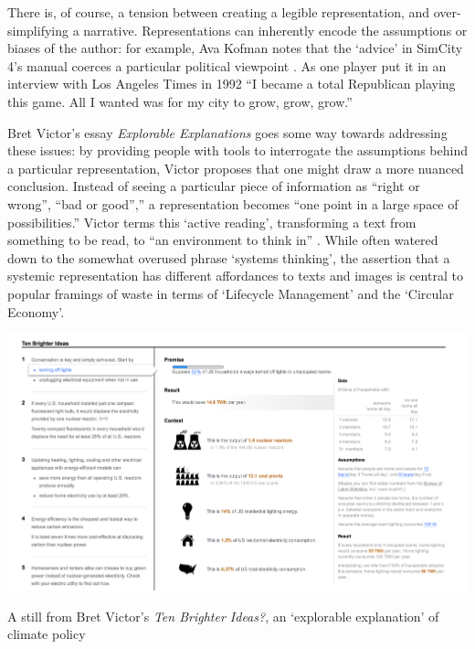 \documentclass[nofonts,nols,justified,nobib]{tufte-book}
\begin{document}

There is, of course, a tension between creating a legible representation, and over-simplifying a narrative. Representations can inherently encode the assumptions or biases of the author: for example, Ava Kofman notes that the `advice' in SimCity 4's manual coerces a particular political viewpoint \cite{kofman_les_2014}. As one player put it in an interview with Los Angeles Times in 1992 ``I became a total Republican playing this game. All I wanted was for my city to grow, grow, grow.''\cite{Baker_model_2019}

Bret Victor's essay \emph{Explorable Explanations} goes some way towards addressing these issues: by providing people with tools to interrogate the assumptions behind a particular representation, Victor proposes that one might draw a more nuanced conclusion. Instead of seeing a particular piece of information as ``right or wrong'', ``bad or good'','' a representation becomes ``one point in a large space of possibilities.'' Victor terms this `active reading', transforming a text from something to be read, to ``an environment to think in'' \cite{victor_explorable_2011}. While often watered down to the somewhat overused phrase `systems thinking', the assertion that a systemic representation has different affordances to texts and images is central to popular framings of waste in terms of `Lifecycle Management' and the `Circular Economy'.

\begin{marginfigure}
\includegraphics[width=\textwidth]{img/1/ten-brighter-ideas.png}
\caption{A still from Bret Victor's \emph{Ten Brighter Ideas?}, an `explorable explanation' of climate policy \cite{victor_ten_2010} }
\end{marginfigure}
\end{document}
